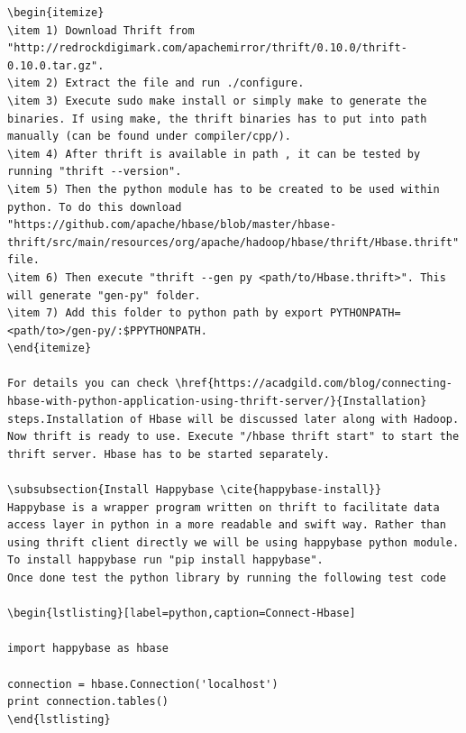 \documentclass[9pt,twocolumn,twoside]{../../styles/osajnl}
\begin{document}
\begin{verbatim}
\begin{itemize}
\item 1) Download Thrift from "http://redrockdigimark.com/apachemirror/thrift/0.10.0/thrift-0.10.0.tar.gz".
\item 2) Extract the file and run ./configure.
\item 3) Execute sudo make install or simply make to generate the binaries. If using make, the thrift binaries has to put into path manually (can be found under compiler/cpp/).
\item 4) After thrift is available in path , it can be tested by running "thrift --version".
\item 5) Then the python module has to be created to be used within python. To do this download "https://github.com/apache/hbase/blob/master/hbase-thrift/src/main/resources/org/apache/hadoop/hbase/thrift/Hbase.thrift" file.
\item 6) Then execute "thrift --gen py <path/to/Hbase.thrift>". This will generate "gen-py" folder.
\item 7) Add this folder to python path by export PYTHONPATH=<path/to>/gen-py/:$PPYTHONPATH.
\end{itemize}

For details you can check \href{https://acadgild.com/blog/connecting-hbase-with-python-application-using-thrift-server/}{Installation} steps.Installation of Hbase will be discussed later along with Hadoop.
Now thrift is ready to use. Execute "/hbase thrift start" to start the thrift server. Hbase has to be started separately.

\subsubsection{Install Happybase \cite{happybase-install}}
Happybase is a wrapper program written on thrift to facilitate data access layer in python in a more readable and swift way. Rather than using thrift client directly we will be using happybase python module. To install happybase run "pip install happybase". 
Once done test the python library by running the following test code 

\begin{lstlisting}[label=python,caption=Connect-Hbase]

import happybase as hbase				

connection = hbase.Connection('localhost')
print connection.tables()
\end{lstlisting}




\end{verbatim}
\end{document}
